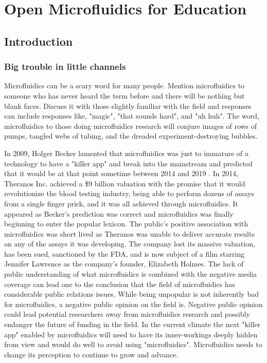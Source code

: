 \chapter{Open Microfluidics for Education}
\label{App:OpenMicrofluidics}

\section{Introduction}

\subsection{Big trouble in little channels}
Microfluidics can be a scary word for many people. Mention microfluidics to someone who has never heard the term before and there will be nothing but blank faces. Discuss it with those slightly familiar with the field and responses can include responses like, "magic", "that sounds hard", and "uh huh". The word, microfluidics to those doing microfluidics research will conjure images of rows of pumps, tangled webs of tubing, and the dreaded experiment-destroying bubbles.

In 2009, Holger Becker lamented that microfluidics was just to immature of a technology to have a "killer app" and break into the mainstream and predicted that it would be at that point sometime between 2014 and 2019 \cite{Becker2009HypeMicrofluidics}. In 2014, Theranos Inc. achieved a \$9 billion valuation with the promise that it would revolutionize the blood testing industry, being able to perform dozens of assays from a single finger prick, and it was all achieved through microfluidics. It appeared as Becker's prediction was correct and microfluidics was finally beginning to enter the popular lexicon. The public's positive association with microfluidics was short lived as Theranos was unable to deliver accurate results on any of the assays it was developing. The company lost its massive valuation, has been sued, sanctioned by the FDA, and is now subject of a film starring Jennifer Lawrence as the company's founder, Elizabeth Holmes. The lack of public understanding of what microfluidics is combined with the negative media coverage can lead one to the conclusion that the field of microfluidics has considerable public relations issues. While being unpopular is not inherently bad for microfluidics, a negative public opinion on the field is. Negative public opinion could lead potential researchers away from microfluidics research and possibly endanger the future of funding in the field. In the current climate the next "killer app" enabled by microfluidics will need to have its inner-workings deeply hidden from view and would do well to avoid using "microfluidics". Microfluidics needs to change its perception to continue to grow and advance.


